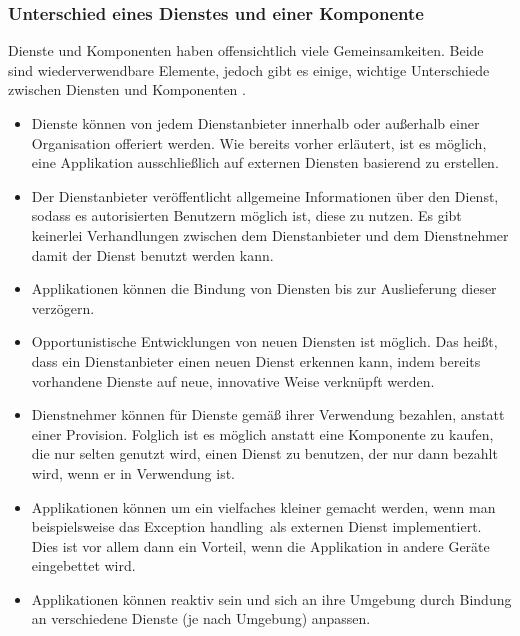 \subsubsection{Unterschied eines Dienstes und einer Komponente}
\label{sec:2_Unterschied_Dienst_Komponente}

Dienste und Komponenten haben offensichtlich viele Gemeinsamkeiten. Beide sind wiederverwendbare Elemente, jedoch gibt es einige, wichtige Unterschiede zwischen Diensten und Komponenten \citereset \autocite{Sommerville.2011}.

\begin{itemize}
\item Dienste können von jedem Dienstanbieter innerhalb oder außerhalb einer Organisation offeriert werden. Wie bereits vorher erläutert, ist es möglich, eine Applikation ausschließlich auf externen Diensten basierend zu erstellen.
\item Der Dienstanbieter veröffentlicht allgemeine Informationen über den Dienst, sodass es autorisierten Benutzern möglich ist, diese zu nutzen. Es gibt keinerlei Verhandlungen zwischen dem Dienstanbieter und dem Dienstnehmer damit der Dienst benutzt werden kann.
\item Applikationen können die Bindung von Diensten bis zur Auslieferung dieser verzögern.
\item Opportunistische Entwicklungen von neuen Diensten ist möglich. Das heißt, dass ein Dienstanbieter einen neuen Dienst erkennen kann, indem bereits vorhandene Dienste auf neue, innovative Weise verknüpft werden.
\item Dienstnehmer können für Dienste gemäß ihrer Verwendung bezahlen, anstatt einer Provision. Folglich ist es möglich anstatt eine Komponente zu kaufen, die nur selten genutzt wird, einen Dienst zu benutzen, der nur dann bezahlt wird, wenn er in Verwendung ist.
\item Applikationen können um ein vielfaches kleiner gemacht werden, wenn man beispielsweise das \glqq Exception handling\grqq\ als externen Dienst implementiert. Dies ist vor allem dann ein Vorteil, wenn die Applikation in andere Geräte eingebettet wird.
\item Applikationen können reaktiv sein und sich an ihre Umgebung durch Bindung an verschiedene Dienste (je nach Umgebung) anpassen.
\end{itemize}

